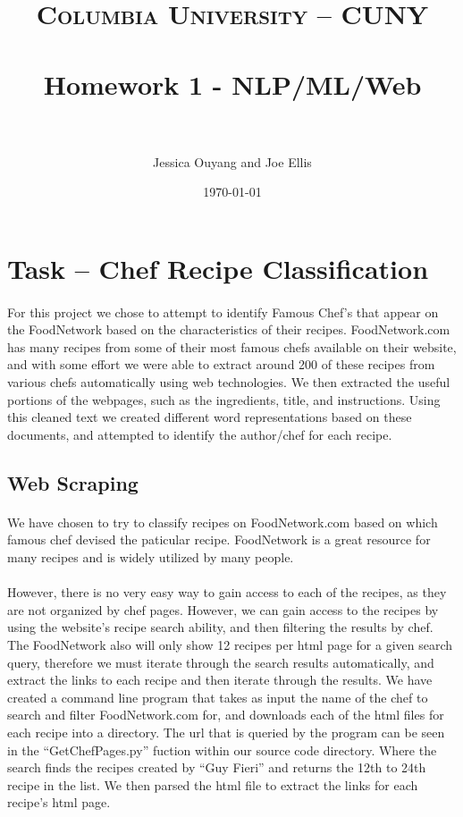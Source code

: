 \documentclass[paper=a4, fontsize=11pt]{scrartcl} %
\title{	
\normalfont \normalsize 
\textsc{Columbia University -- CUNY} \\ [25pt] %
\horrule{0.5pt} \\[0.4cm] %
\huge Homework 1 - NLP/ML/Web \\ %
\horrule{2pt} \\[0.5cm] %
}
\author{Jessica Ouyang and Joe Ellis} %
\date{\normalsize\today} %
\begin{document}
\maketitle %


\section{Task -- Chef Recipe Classification}
\paragraph{}
For this project we chose to attempt to identify Famous Chef's that appear on the FoodNetwork based on the characteristics of their recipes.
FoodNetwork.com has many recipes from some of their most famous chefs available on their website, and with some effort we were able to extract around 200 of these recipes from various chefs automatically using web technologies.  We then extracted the useful portions of the webpages, such as the ingredients, title, and instructions.  Using this cleaned text we created different word representations based on these documents, and attempted to identify the author/chef for each recipe.  


\subsection{Web Scraping}

\paragraph{}
We have chosen to try to classify recipes on FoodNetwork.com based on which famous chef devised the paticular recipe.  
FoodNetwork is a great resource for many recipes and is widely utilized by many people.

\paragraph{}
However, there is no very easy way to gain access to each of the recipes, as they are not organized by chef pages.  However, we can gain access to the recipes by using the website’s recipe search ability, and then filtering the results by chef.  The FoodNetwork also will only show 12 recipes per html page for a given search query, therefore we must iterate through the search results automatically, and extract the links to each recipe and then iterate through the results.  We have created a command line program that takes as input the name of the chef to search and filter FoodNetwork.com for, and downloads each of the html files for each recipe into a directory.  The url that is queried by the program can be seen in the ``GetChefPages.py'' fuction within our source code directory.  Where the search finds the recipes created by “Guy Fieri” and returns the 12th to 24th recipe in the list.  We then parsed the html file to extract the links for each recipe’s html page.
\end{document}
